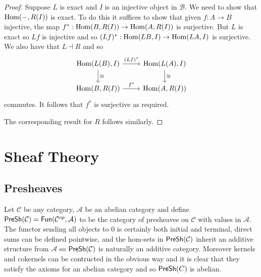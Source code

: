 \documentclass{memoir}
\begin{document}
\begin{proof}
    Suppose $L$ is exact and $I$ is an injective object in $\mathcal B$.
    We need to show that $\operatorname{Hom}(-,R(I))$ is exact.
    To do this it suffices to show that given $f:A\to B$ injective, the map $f^*:\operatorname{Hom}(B,R(I))\to\operatorname{Hom}(A,R(I))$ is surjective.
    But $L$ is exact so $Lf$ is injective and so $(Lf)^*:\operatorname{Hom}(LB,I)\to\operatorname{Hom}(LA,I)$ is surjective.
    We also have that $L\dashv R$ and so 
    \begin{equation}
        \begin{tikzcd}
            \Hom(L(B),I) \arrow[d,"\cong"] \arrow[r,"(Lf)^*"] & \Hom(L(A),I) \arrow[d,"\cong"] \\
            \Hom(B,R(I)) \arrow[r,"f^*"] & \Hom(A,R(I))
        \end{tikzcd}
    \end{equation}
    commutes.
    It follows that $f^*$ is surjective as required.

    The corresponding result for $R$ follows similarly.
\end{proof}
\chapter{Sheaf Theory}
\section{Presheaves}
Let $\mathcal C$ be any category, $\mathcal A$ be an abelian category and define ${\normalfont\mathsf{PreSh}}(\mathcal C) = {\normalfont\mathsf{Fun}}(\mathcal C^{op},\mathcal A)$ to be the category of presheaves on $\mathcal C$ with values in $\mathcal A$.
The functor sending all objects to $0$ is certainly both initial and terminal, direct sums can be defined pointwise, and the hom-sets in ${\normalfont\mathsf{PreSh}}(\mathcal C)$ inherit an additive structure from $\mathcal A$ so ${\normalfont\mathsf{PreSh}}(\mathcal C)$ is naturally an additive category.
Moreover kernels and cokernels can be contructed in the obvious way and it is clear that they satisfy the axioms for an abelian category and so ${\normalfont\mathsf{PreSh}}(C)$ is abelian.
\end{document}
